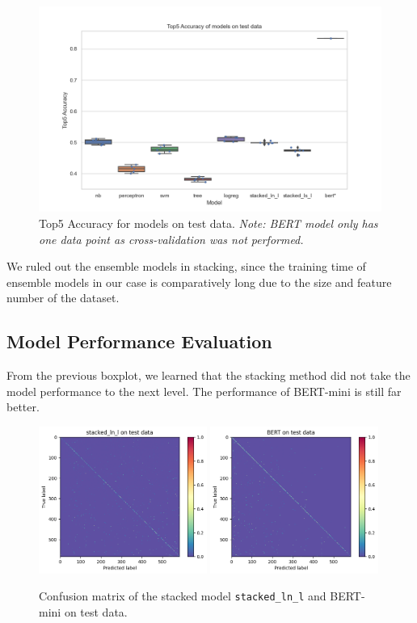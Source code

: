 \documentclass[
]{kaohandt}
\begin{document}
\begin{figure}[h]
	\includegraphics{metric_test_score}
	\caption{Top5 Accuracy for models on test data. \emph{Note: BERT model only has one data point as cross-validation was not performed.}}
	\label{fig:acc_test}
\end{figure}

We ruled out the ensemble models in stacking, since the training time of ensemble models in our case is comparatively long due to the size and feature number of the dataset.

\subsection*{Model Performance Evaluation}

From the previous boxplot, we learned that the stacking method did not take the model performance to the next level. The performance of BERT-mini is still far better.

\begin{figure}[h]
	\includegraphics[width=0.49\textwidth]{confusion_matrix_stacked_ln_l_test}
	\includegraphics[width=0.49\textwidth]{confusion_matrix_bert_test}
	\caption{Confusion matrix of the stacked model \texttt{stacked\_ln\_l} and BERT-mini on test data.}
	\label{fig:conf_mat}
\end{figure}
\end{document}
